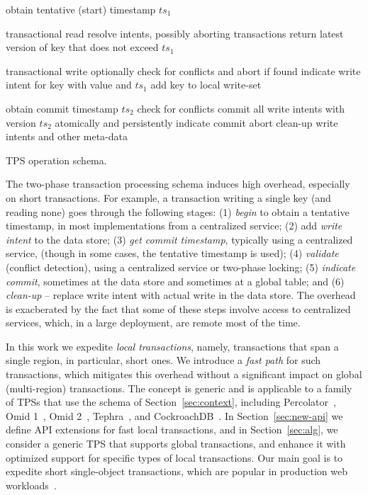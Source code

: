 \begin{algorithm}[tb]
\begin{algorithmic}[1]
\State obtain tentative (start) timestamp $ts_1$ 
\EndProcedure
\Statex

 \Comment transactional read
	\State resolve intents, possibly  aborting transactions \label{l:resolve}
\EndIf
\State return latest version of key that does not exceed $ts_1$
\EndProcedure
\Statex

 \Comment transactional write
\State optionally check for conflicts and abort if found 
\State indicate write intent for key with value and $ts_1$
\State add key to local write-set
\EndProcedure
\Statex

\State obtain commit timestamp $ts_2$
  \Comment check for conflicts  \label{l:validate}
	\Statex \Comment commit all write intents with version $ts_2$
	\State atomically and persistently indicate commit   \label{l:commit}
\Else
	\State abort	
\EndIf
\State clean-up write intents and other meta-data
\EndProcedure
\end{algorithmic}
\caption{TPS operation schema.} 
\label{alg:schema}
\end{algorithm} 

The two-phase transaction processing schema induces high overhead, especially on short transactions. For example, a transaction writing a single key (and reading none) goes through the following stages:  
(1) \emph{begin} to obtain a tentative timestamp, in most implementations from a centralized service;  
(2) add \emph{write intent} to the data store; 
(3) \emph{get commit timestamp}, typically using a centralized service, (though in some cases, the tentative timestamp is used);
(4) \emph{validate} (conflict detection), using a centralized service or two-phase locking; 
(5) \emph{indicate commit}, sometimes at the data store and sometimes at a global table; and 
(6) \emph{clean-up} -- replace write intent with actual write in the data store. 
The overhead is exacberated by 
the fact that some of these steps involve access to centralized services, which, in a large deployment, are remote most of the time.

In this work we expedite   \emph{local transactions}, namely,  transactions that span a single region, in particular, short ones. We
introduce a \emph{fast path} for such transactions, which mitigates this overhead
without a significant impact on global (multi-region) transactions.
The concept is generic and is applicable to a family of TPSs that use the schema of Section~\ref{sec:context}, 
including Percolator~\cite{Percolator2010}, Omid 1~\cite{OmidICDE2014}, Omid 2~\cite{omid-blog}, Tephra~\cite{tephra}, 
and CockroachDB~\cite{cockroach}. 
In Section~\ref{sec:new-api} we define API extensions for fast local transactions, 
and in Section~\ref{sec:alg}, we consider  a generic TPS that supports global transactions, 
and enhance it with optimized support for specific types of local transactions. 
Our main goal is to expedite short single-object transactions,
which are popular in production web workloads~\cite{omid-blog}.

